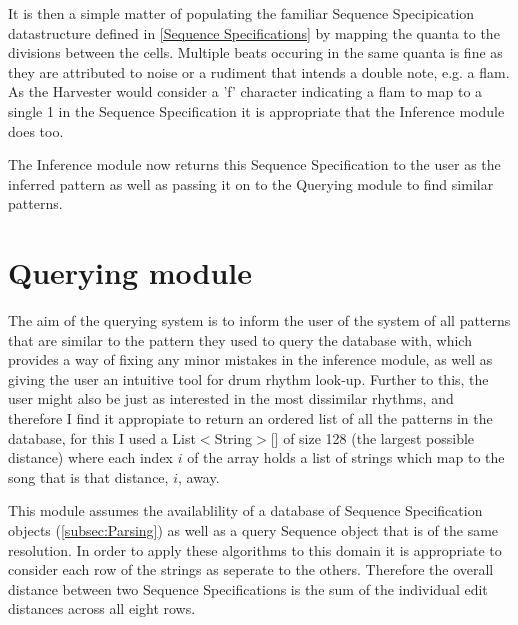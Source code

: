 \documentclass[12pt,twoside,notitlepage]{report}
\begin{document}
		It is then a simple matter of populating the familiar Sequence Specipication datastructure defined in \ref{Sequence Specifications} by mapping the quanta to the divisions between the cells. Multiple beats occuring in the same quanta is fine as they are attributed to noise or a rudiment that intends a double note, e.g. a flam. As the Harvester would consider a 'f' character indicating a flam to map to a single 1 in the Sequence Specification it is appropriate that the Inference module does too.
		
		The Inference module now returns this Sequence Specification to the user as the inferred pattern as well as passing it on to the Querying module to find similar patterns.
		
		
	\section{Querying module}\label{sec:Distance metrics}
	The aim of the querying system is to inform the user of the system of all patterns that are similar to the pattern they used to query the database with, which provides a way of fixing any minor mistakes in the inference module, as well as giving the user an intuitive tool for drum rhythm look-up. Further to this, the user might also be just as interested in the most dissimilar rhythms, and therefore I find it appropiate to return an ordered list of all the patterns in the database, for this I used a List$<$String$>$[] of size 128 (the largest possible distance) where each index $i$ of the array holds a list of strings which map to the song that is that distance, $i$, away.
	
	This module assumes the availablility of a database of Sequence Specification objects (\ref{subsec:Parsing}) as well as a query Sequence object that is of the same resolution. In order to apply these algorithms to this domain it is appropriate to consider each row of the strings as seperate to the others. Therefore the overall distance between two Sequence Specifications is the sum of the individual edit distances across all eight rows.
	
\end{document}
